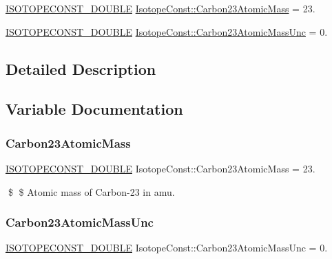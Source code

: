 \begin{DoxyCompactItemize}
\item 
\mbox{\hyperlink{group___isotope_const-_macros_ga8f45a7272ce02c0b4c65c44636ed719a}{I\+S\+O\+T\+O\+P\+E\+C\+O\+N\+S\+T\+\_\+\+D\+O\+U\+B\+LE}} \mbox{\hyperlink{group___isotope_const-_carbon-_c23_gabb9faf285854154578cd52fefc90f0e7}{Isotope\+Const\+::\+Carbon23\+Atomic\+Mass}} = 23.
\item 
\mbox{\hyperlink{group___isotope_const-_macros_ga8f45a7272ce02c0b4c65c44636ed719a}{I\+S\+O\+T\+O\+P\+E\+C\+O\+N\+S\+T\+\_\+\+D\+O\+U\+B\+LE}} \mbox{\hyperlink{group___isotope_const-_carbon-_c23_gaef85254c5ef98df367a2138e7a293e65}{Isotope\+Const\+::\+Carbon23\+Atomic\+Mass\+Unc}} = 0.
\end{DoxyCompactItemize}


\subsection{Detailed Description}


\subsection{Variable Documentation}
\mbox{\label{group___isotope_const-_carbon-_c23_gabb9faf285854154578cd52fefc90f0e7}} 
\subsubsection{\texorpdfstring{Carbon23\+Atomic\+Mass}{Carbon23AtomicMass}}
{\footnotesize\ttfamily \mbox{\hyperlink{group___isotope_const-_macros_ga8f45a7272ce02c0b4c65c44636ed719a}{I\+S\+O\+T\+O\+P\+E\+C\+O\+N\+S\+T\+\_\+\+D\+O\+U\+B\+LE}} Isotope\+Const\+::\+Carbon23\+Atomic\+Mass = 23.}

\$ \$ Atomic mass of Carbon-\/23 in amu. \mbox{\label{group___isotope_const-_carbon-_c23_gaef85254c5ef98df367a2138e7a293e65}} 
\subsubsection{\texorpdfstring{Carbon23\+Atomic\+Mass\+Unc}{Carbon23AtomicMassUnc}}
{\footnotesize\ttfamily \mbox{\hyperlink{group___isotope_const-_macros_ga8f45a7272ce02c0b4c65c44636ed719a}{I\+S\+O\+T\+O\+P\+E\+C\+O\+N\+S\+T\+\_\+\+D\+O\+U\+B\+LE}} Isotope\+Const\+::\+Carbon23\+Atomic\+Mass\+Unc = 0.}

